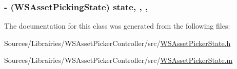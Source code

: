 \hypertarget{interface_w_s_asset_picker_state_a06ab524e5e7a0b75fa584810c7af9244}{
\subsubsection[{state}]{\setlength{\rightskip}{0pt plus 5cm}-\/ ({\bf W\-S\-Asset\-Picking\-State}) state\hspace{0.3cm}{\ttfamily [read]}, {\ttfamily [write]}, {\ttfamily [nonatomic]}, {\ttfamily [assign]}}}\label{interface_w_s_asset_picker_state_a06ab524e5e7a0b75fa584810c7af9244}


The documentation for this class was generated from the following files\-:\begin{DoxyCompactItemize}
\item 
Sources/\-Librairies/\-W\-S\-Asset\-Picker\-Controller/src/\hyperlink{_w_s_asset_picker_state_8h}{W\-S\-Asset\-Picker\-State.\-h}\item 
Sources/\-Librairies/\-W\-S\-Asset\-Picker\-Controller/src/\hyperlink{_w_s_asset_picker_state_8m}{W\-S\-Asset\-Picker\-State.\-m}\end{DoxyCompactItemize}
